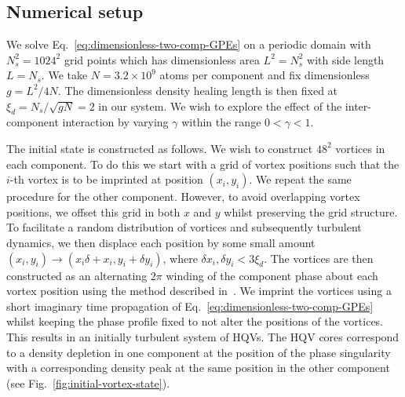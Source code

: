 \subsection{Numerical setup}\label{sec:numerical-setup}
We solve Eq.~\eqref{eq:dimensionless-two-comp-GPEs} on a periodic domain with 
$N_s^2=1024^2$ grid points which has dimensionless area $L^2=N_s^2$ with side
length $L=N_s$.
We take $N=3.2\times10^9$ atoms per component and fix dimensionless $g=L^2/4N$.
The dimensionless density healing length is then fixed at
$\xi_d=N_s/\sqrt{gN}=2$ in our system.
We wish to explore the effect of the inter-component interaction by varying
$\gamma$ within the range $0 < \gamma < 1$.\par

The initial state is constructed as follows.
We wish to construct $48^2$ vortices in each component.
To do this we start with a grid of vortex positions such that the 
$i$-th vortex is to be imprinted at position $(x_i, y_i)$.
We repeat the same procedure for the other component.
However, to avoid overlapping vortex positions, we offset this grid in both $x$
and $y$ whilst preserving the grid structure.
To facilitate a random distribution of vortices and subsequently turbulent
dynamics, we then displace each position by some small amount 
$(x_i, y_i) \rightarrow (x_i \delta + x_i, y_i + \delta y_i)$, where 
$\delta x_i, \delta y_i < 3\xi_d$.
The vortices are then constructed as an alternating $2\pi$ winding of the
component phase about each vortex position using the method described
in~\cite{Billam2014}.
We imprint the vortices using a short imaginary time propagation of
Eq.~\eqref{eq:dimensionless-two-comp-GPEs} whilst keeping the phase profile
fixed to not alter the positions of the vortices.
This results in an initially turbulent system of HQVs.
The HQV cores correspond to a density depletion in one component at the position
of the phase singularity with a corresponding density peak at the same position
in the other component (see Fig.~\ref{fig:initial-vortex-state}).
